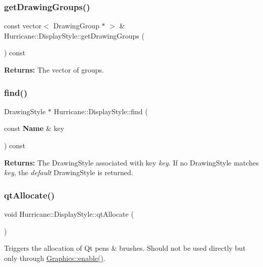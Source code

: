 \subsubsection{\texorpdfstring{get\+Drawing\+Groups()}{getDrawingGroups()}}
{\footnotesize\ttfamily const vector$<$ Drawing\+Group $\ast$ $>$ \& Hurricane\+::\+Display\+Style\+::get\+Drawing\+Groups (\begin{DoxyParamCaption}{ }\end{DoxyParamCaption}) const\hspace{0.3cm}{\ttfamily [inline]}}

{\bfseries Returns\+:} The vector of groups. \mbox{\label{classHurricane_1_1DisplayStyle_ac7a76fdc5cf9e9a74840b9846bd390fc}} 
\subsubsection{\texorpdfstring{find()}{find()}}
{\footnotesize\ttfamily Drawing\+Style $\ast$ Hurricane\+::\+Display\+Style\+::find (\begin{DoxyParamCaption}\item[{const \textbf{ Name} \&}]{key }\end{DoxyParamCaption}) const}

{\bfseries Returns\+:} The Drawing\+Style associated with key {\itshape key}. If no Drawing\+Style matches {\itshape key}, the {\itshape default} Drawing\+Style is returned. \mbox{\label{classHurricane_1_1DisplayStyle_a9288b2780ffd5fccf94a41b597ed2efd}} 
\subsubsection{\texorpdfstring{qt\+Allocate()}{qtAllocate()}}
{\footnotesize\ttfamily void Hurricane\+::\+Display\+Style\+::qt\+Allocate (\begin{DoxyParamCaption}{ }\end{DoxyParamCaption})}

Triggers the allocation of Qt pens \& brushes. Should not be used directly but only through \hyperlink{classHurricane_1_1Graphics_a08e5240382c4bc97fd84b6fa0e7d8b8e}{Graphics\+::enable()}. \mbox{\label{classHurricane_1_1DisplayStyle_ae21071635857843536511f21da5533c7}} 
